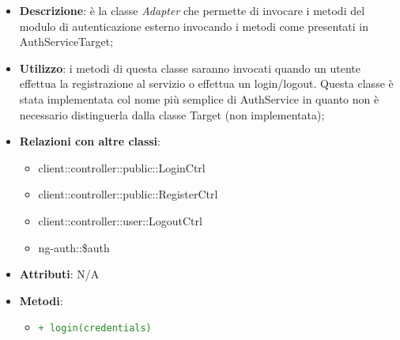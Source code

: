 			\begin{itemize}
				\item \textbf{Descrizione}: è la classe \emph{Adapter} che permette di invocare i metodi del modulo di autenticazione esterno invocando i metodi come presentati in AuthServiceTarget;
				\item \textbf{Utilizzo}:  i metodi di questa classe saranno invocati quando un utente effettua la registrazione al servizio o effettua un login/logout. Questa classe è stata implementata col nome più semplice di AuthService in quanto non è necessario distinguerla dalla classe Target (non implementata);
				\item \textbf{Relazioni con altre classi}:
					\begin{itemize}
						\item client::controller::public::LoginCtrl
						\item client::controller::public::RegisterCtrl
						\item client::controller::user::LogoutCtrl
						\item ng-auth::\$auth
					\end{itemize}
				\item \textbf{Attributi}: N/A
				\item \textbf{Metodi}:
				\begin{itemize}
					\item \textcolor{forestgreen}{\texttt{+ login(credentials)}}
\end{itemize}
\end{itemize}
